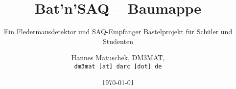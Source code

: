 \documentclass[11pt, a4paper,parskip=half]{scrartcl}
\title{Bat'n'SAQ -- Baumappe}
\subtitle{Ein Fledermausdetektor und SAQ-Empfänger Bastelprojekt für Schüler und Studenten}
\author{Hannes Matuschek, DM3MAT,\\\texttt{dm3mat [at] darc [dot] de}}
\date{\today}
\begin{document}
\begin{titlepage}
\maketitle
\vfill
\end{titlepage}
\end{document}

